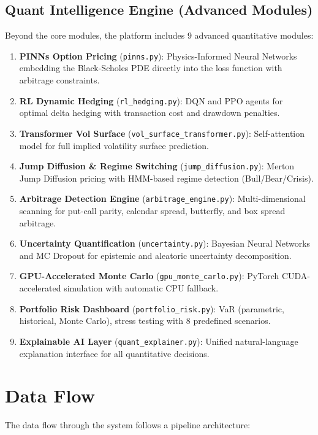 \documentclass[12pt,a4paper]{report}
\begin{document}
\subsection{Quant Intelligence Engine (Advanced Modules)}

Beyond the core modules, the platform includes 9 advanced quantitative modules:

\begin{enumerate}
    \item \textbf{PINNs Option Pricing} (\texttt{pinns.py}): Physics-Informed Neural Networks embedding the Black-Scholes PDE directly into the loss function with arbitrage constraints.
    \item \textbf{RL Dynamic Hedging} (\texttt{rl\_hedging.py}): DQN and PPO agents for optimal delta hedging with transaction cost and drawdown penalties.
    \item \textbf{Transformer Vol Surface} (\texttt{vol\_surface\_transformer.py}): Self-attention model for full implied volatility surface prediction.
    \item \textbf{Jump Diffusion \& Regime Switching} (\texttt{jump\_diffusion.py}): Merton Jump Diffusion pricing with HMM-based regime detection (Bull/Bear/Crisis).
    \item \textbf{Arbitrage Detection Engine} (\texttt{arbitrage\_engine.py}): Multi-dimensional scanning for put-call parity, calendar spread, butterfly, and box spread arbitrage.
    \item \textbf{Uncertainty Quantification} (\texttt{uncertainty.py}): Bayesian Neural Networks and MC Dropout for epistemic and aleatoric uncertainty decomposition.
    \item \textbf{GPU-Accelerated Monte Carlo} (\texttt{gpu\_monte\_carlo.py}): PyTorch CUDA-accelerated simulation with automatic CPU fallback.
    \item \textbf{Portfolio Risk Dashboard} (\texttt{portfolio\_risk.py}): VaR (parametric, historical, Monte Carlo), stress testing with 8 predefined scenarios.
    \item \textbf{Explainable AI Layer} (\texttt{quant\_explainer.py}): Unified natural-language explanation interface for all quantitative decisions.
\end{enumerate}

\section{Data Flow}

The data flow through the system follows a pipeline architecture:
\end{document}
